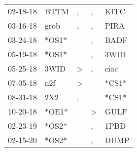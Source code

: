 \begin{supertabular}{lllll}
 02-18-18 &   BTTM &             , &             , &   KITC \\
 03-16-18 &   grob &             , &             , &   PIRA \\
 03-24-18 &  *OS1* &               &             , &   BADF \\
 05-19-18 &  *OS1* &               &             , &   3WID \\
 05-25-18 &   3WID &  \textgreater &             , &   ciac \\
 07-05-18 &    n2f &  \textgreater &               &  *CS1* \\
 08-31-18 &    2X2 &             , &               &  *CS1* \\
 10-20-18 &  *OE1* &               &  \textgreater &   GULF \\
 02-23-19 &  *OS2* &               &             , &   1PBD \\
 02-15-20 &  *OS2* &               &             , &   DUMP \\
\end{supertabular}
